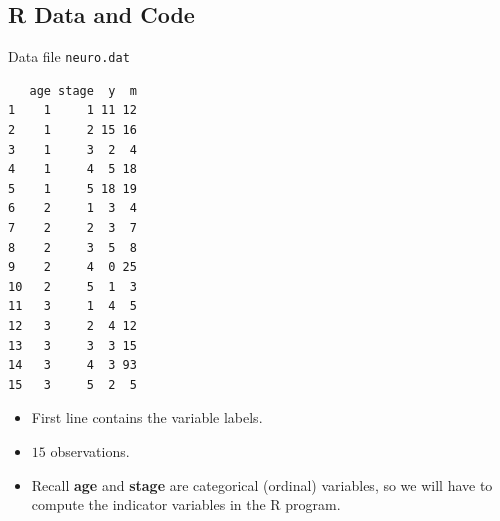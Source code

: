 \documentclass[oneside]{book}\usepackage[]{graphicx}\usepackage[svgnames]{xcolor}
\makeatletter
\newenvironment{kframe}{%
 \def\at@end@of@kframe{}%
 \ifinner\ifhmode%
  \def\at@end@of@kframe{\end{minipage}}%
  \begin{minipage}{\columnwidth}%
 \fi\fi%
 \def\FrameCommand##1{\hskip\@totalleftmargin \hskip-\fboxsep
 \colorbox{shadecolor}{##1}\hskip-\fboxsep
     \hskip-\linewidth \hskip-\@totalleftmargin \hskip\columnwidth}%
 \MakeFramed {\advance\hsize-\width
   \@totalleftmargin\z@ \linewidth\hsize
   \@setminipage}}%
 {\par\unskip\endMakeFramed%
 \at@end@of@kframe}
\newenvironment{knitrout}{}{} %
\makeatother
\begin{document}
\subsection*{R Data and Code}
\begin{Example}{Data file \texttt{neuro.dat}}
\begin{knitrout}
\color{fgcolor}\begin{kframe}
\begin{verbatim}
   age stage  y  m
1    1     1 11 12
2    1     2 15 16
3    1     3  2  4
4    1     4  5 18
5    1     5 18 19
6    2     1  3  4
7    2     2  3  7
8    2     3  5  8
9    2     4  0 25
10   2     5  1  3
11   3     1  4  5
12   3     2  4 12
13   3     3  3 15
14   3     4  3 93
15   3     5  2  5
\end{verbatim}
\end{kframe}
\end{knitrout}
\end{Example}
\begin{itemize}
      \item First line contains the variable labels.
      \item $ 15 $ observations.
      \item Recall \textbf{age} and \textbf{stage} are categorical (ordinal) variables, so we will have to compute the indicator variables in the R program.
\end{itemize}
\end{document}
